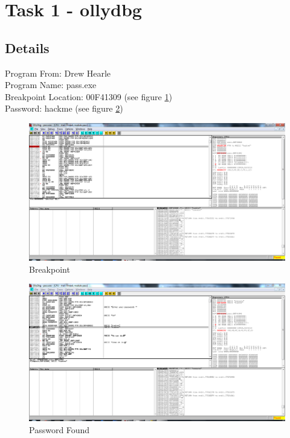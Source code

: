 \documentclass{article}
\begin{document}
\pagestyle{fancy}

\section{Task 1 - ollydbg}
\subsection{Details}
\FloatBarrier
Program From: Drew Hearle\\
Program Name: pass.exe\\
Breakpoint Location: 00F41309 (see figure \ref{fig:breakpoint})\\
Password: hackme (see figure \ref{fig:hackmefound})\\

\begin{figure}[breakpoint]
\centering
\includegraphics[width=1\textwidth]{breakpoint}
\caption{Breakpoint}
\label{fig:breakpoint}
\end{figure}

\begin{figure}[backmefound]
\centering
\includegraphics[width=1\textwidth]{hackmefound}
\caption{Password Found}
\label{fig:hackmefound}
\end{figure}
\end{document}
